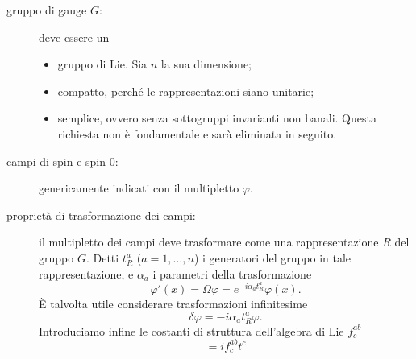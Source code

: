 \documentclass[italian,a4paper]{article}
\theoremstyle{definition}
\begin{document}
\begin{description}
    \item[gruppo di gauge $G$:] deve essere un
        \begin{itemize}
            \item gruppo di Lie. Sia $n$ la sua dimensione;
            \item compatto, perch\'e le rappresentazioni siano unitarie;
            \item semplice, ovvero senza sottogruppi invarianti non banali.
                Questa richiesta non \`e fondamentale e sar\`a eliminata in
                seguito.
        \end{itemize}
    \item[campi di spin  e spin $0$:] genericamente indicati
        con il multipletto $\varphi$.
    \item[propriet\`a di trasformazione dei campi: ] il multipletto dei
        campi deve trasformare come una rappresentazione $R$ del gruppo
        $G$. Detti $t^{a}_{R}$ ($a = 1, \dots, n$) i generatori del
        gruppo in tale rappresentazione, e $\alpha_a$  i parametri della
        trasformazione
        \begin{equation*}
            \varphi'(x) = \Omega\varphi = e^{-i \alpha_a t^{a}_{R}}\varphi(x).
        \end{equation*}
        \`E talvolta utile considerare trasformazioni infinitesime
        \begin{equation*}
            \delta\varphi =   -i \alpha_a t^{a}_{R} \varphi.
        \end{equation*}
        Introduciamo infine le costanti di struttura dell'algebra di Lie
        $f^{ab}_{c}$
        \begin{equation*}
            [t^{a}, t^{b}] = if^{ab}_{c}t^{c}
        \end{equation*}
\end{description}
\end{document}

